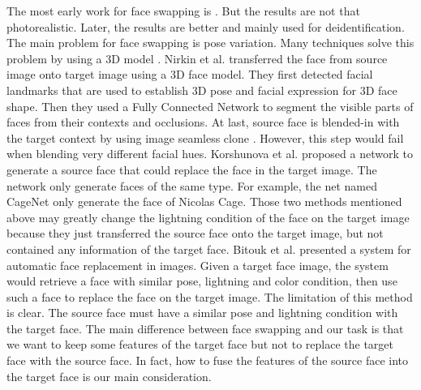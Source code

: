 The most early work for face swapping is \cite{exchface}. But the results are not that photorealistic. Later, the results are better \cite{de1,de2,de3,de4} and mainly used for deidentification. The main problem for face swapping is pose variation.
Many techniques solve this problem by using a 3D model \cite{3d1,de3,onseg}. Nirkin et al. \cite{onseg} transferred the face from source image onto target image using a 3D face model. They first detected facial landmarks that are used to establish 3D pose and facial expression for 3D face shape. Then they used a Fully Connected Network to segment the visible parts of faces from their contexts and occlusions. At last, source face is blended-in with the target context by using image seamless clone \cite{pie}. However, this step would fail when blending very different facial hues. Korshunova et al. \cite{faceswapping} proposed a network to generate a source face that could replace the face in the target image. The network only generate faces of the same type. For example, the net named CageNet only generate the face of Nicolas Cage. Those two methods mentioned above may greatly change the lightning condition of the face on the target image because they just transferred the source face onto the target image, but not contained any information of the target face. Bitouk et al. \cite{autorep} presented a system for automatic face replacement in images. Given a target face image, the system would retrieve a face with similar pose, lightning and color condition, then use such a face to replace the face on the target image. The limitation of this method is clear. The source face must have a similar pose and lightning condition with the target face.
%
The main difference between face swapping and our task is that we want to keep some features of the target face but not to replace the target face with the source face. In fact, how to fuse the features of the source face into the target face is our main consideration.
